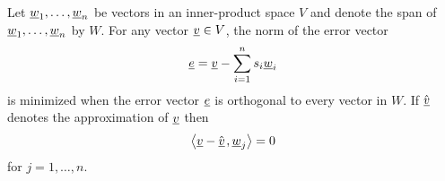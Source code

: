 \begin{theorem}
Let $\underline{w}_1, \ldots, \underline{w}_n$ be vectors in an inner-product space $V$ and denote the span of $\underline{w}_1, \ldots, \underline{w}_n$ by $W$.
For any vector $\underline{v} \in V$, the norm of the error vector
\begin{equation} \label{equation:OrthogonalProjectionError}
\underline{e} = \underline{v} - \sum_{i=1}^n s_i \underline{w}_i
\end{equation}
is minimized when the error vector $\underline{e}$ is orthogonal to every vector in $W$.
If $\hat{\underline{v}}$ denotes the  approximation of $\underline{v}$ then
\begin{equation*}
{\left\langle  \underline{v} - \hat{\underline{v}}  \mskip2mu ,  \underline{w}_j  \right\rangle} = 0
\end{equation*}
for $j = 1, \ldots, n$.
\end{theorem}
